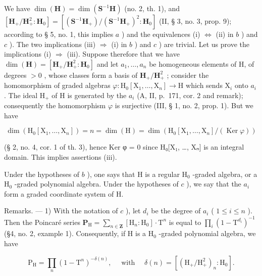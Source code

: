 We have \(\dim(\mathbf{H})=\dim(\mathbf{S}^{-1}\mathbf{H})\) (no. 2, th. 1), and \([\mathbf{H}_{+}/\mathbf{H}_{+}^{2}:\mathbf{H}_{0}]=[(\mathbf{S}^{-1}\mathbf{H}_{+})/(\mathbf{S}^{-1}\mathbf{H}_{+})^{2}:\mathbf{H}_{0}]\) (II, § 3, no. 3, prop. 9); according to § 5, no. 1, this implies \(a\) ) and the equivalences (i) \(\Leftrightarrow\) (ii) in \(b\) ) and \(c\) ). The two implications (iii) \(\Rightarrow\) (i) in \(b\) ) and \(c\) ) are trivial. Let us prove the implications (i) \(\Rightarrow\) (iii). Suppose therefore that we have \(\dim(\mathbf{H})=[\mathbf{H}_{+}/\mathbf{H}_{+}^{2}:\mathbf{H}_{0}]\) and let \(a_{1},\ldots,a_{n}\) be homogeneous elements of H, of degrees \(>0\) , whose classes form a basis of \(\mathbf{H}_{+}/\mathbf{H}_{+}^{2}\) ; consider the homomorphism of graded algebras \(\varphi:\mathrm{H}_{0}[\mathrm{X}_{1},\ldots,\mathrm{X}_{n}]\to\mathrm{H}\) which sends \(\mathrm{X}_{i}\) onto \(a_{i}\) . The ideal \(\mathrm{H}_{+}\) of H is generated by the \(a_{i}\) (A, II, p.~171, cor. 2 and remark); consequently the homomorphism \(\varphi\) is surjective (III, § 1, no. 2, prop. 1). But we have

\[
\dim \left(\mathrm{H} _ {0} \left[ \mathrm{X} _ {1}, \dots , \mathrm{X} _ {n} \right]\right) = n = \dim (\mathrm{H}) = \dim \left(\mathrm{H} _ {0} \left[ \mathrm{X} _ {1}, \dots , \mathrm{X} _ {n} \right] / (\operatorname{Ker} \varphi)\right)
\]

(§ 2, no. 4, cor. 1 of th. 3), hence Ker φ = 0 since H₀{[}X₁, \ldots, Xₙ{]} is an integral domain. This implies assertions (iii).

Under the hypotheses of \(b\) ), one says that H is a regular \(\mathrm{H}_{0}\) -graded algebra, or a \(\mathrm{H}_{0}\) -graded polynomial algebra. Under the hypotheses of \(c\) ), we say that the \(a_{i}\) form a graded coordinate system of H.

Remarks. --- 1) With the notation of \(c\) ), let \(d_{i}\) be the degree of \(a_{i}\) ( \(1 \leqslant i \leqslant n\) ). Then the Poincaré series \(\mathbf{P}_{\mathrm{H}} = \sum_{n \in \mathbf{Z}} [\mathrm{H}_{n} : \mathrm{H}_{0}] \cdot \mathrm{T}^{n}\) is equal to \(\prod_{i} (1 - \mathrm{T}^{d_{i}})^{-1}\) (§4, no. 2, example 1). Consequently, if H is a \(\mathrm{H}_{0}\) -graded polynomial algebra, we have

\[
\mathrm{P} _ {\mathrm{H}} = \prod_ {n} (1 - \mathrm{T} ^ {n}) ^ {- \delta (n)}, \quad \text { with } \quad \delta (n) = \left[ (\mathrm{H} _ {+} / \mathrm{H} _ {+} ^ {2}) _ {n}: \mathrm{H} _ {0} \right].
\]

